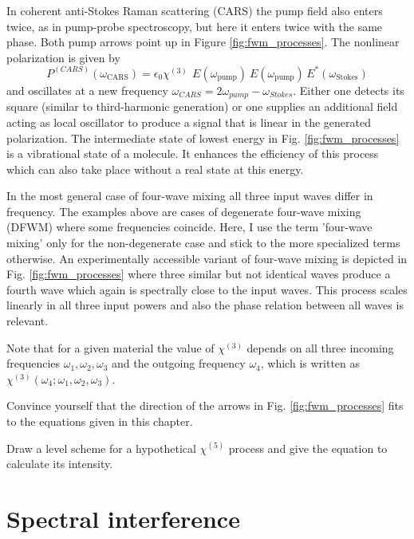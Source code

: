 In coherent anti-Stokes Raman scattering (CARS) the pump field also enters twice, as in pump-probe spectroscopy, but here it enters twice with the same phase. Both pump arrows point up in Figure \ref{fig:fwm_processes}. The nonlinear polarization is given by 
%
\begin{equation}
P^{(CARS)}(\omega_{\text{CARS}}) = 
\epsilon_0 \chi^{(3)} \, \ E(\omega_{\text{pump}}) \ E(\omega_{\text{pump}})  \, E^*(\omega_{\text{Stokes}}) 
\label{eq:fwm_chi3-cars}
\end{equation}
%
and oscillates at a new frequency $\omega_{CARS} = 2 \omega_{pump} - \omega_{Stokes}$. Either one detects its square (similar to third-harmonic generation) or one supplies an additional field acting as local oscillator to produce a signal that is linear in the generated polarization. The intermediate state of lowest energy in Fig. \ref{fig:fwm_processes} is a vibrational state of a molecule. It enhances the efficiency of this process which can also take place without a real state at this energy. 

In the most general case of four-wave mixing all three input waves differ in frequency. The examples above are cases of degenerate four-wave mixing (DFWM) where some frequencies coincide. Here, I use the term 'four-wave mixing' only for the non-degenerate case and stick to the more specialized terms otherwise. An experimentally accessible variant of four-wave mixing is depicted in Fig. \ref{fig:fwm_processes} where three similar but not identical waves produce a fourth wave which again is spectrally close to the input waves. This process scales linearly in all three input powers and also the phase relation between all waves is relevant.

Note that for a given material the value of $\chi^{(3)} $ depends on all three incoming frequencies $\omega_1, \omega_2, \omega_3$ and the outgoing frequency $\omega_4$, which is written as  $\chi^{(3)}(\omega_4; \omega_1, \omega_2, \omega_3)$. 

\begin{questions}
\item Convince yourself that the direction of the arrows in  Fig. \ref{fig:fwm_processes} fits to the equations given in this chapter.

\item Draw a level scheme for a hypothetical $\chi^{(5)}$ process and give the equation to calculate its intensity.
\end{questions}


\section{Spectral interference}

